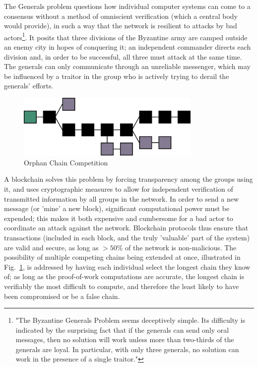 \documentclass[12pt,journal]{IEEEtran}
\begin{document}
The Generals problem questions how individual computer systems can come to a consensus without a method of omniscient verification (which a central body would provide), in such a way that the network is resilient to attacks by bad actors\footnote{"The Byzantine Generals Problem seems deceptively simple. Its difficulty is indicated by the surprising fact that if the generals can send only oral messages, then no solution will work unless more than two-thirds of the generals are loyal. In particular, with only three generals, no solution can work in the presence of a single traitor."\cite{lamport1982byzantine}}. It posits that three divisions of the Byzantine army are camped outside an enemy city in hopes of conquering it; an independent commander directs each division and, in order to be successful, all three must attack at the same time\cite{lamport1982byzantine}. The generals can only communicate through an unreliable messenger, which may be influenced by a traitor in the group who is actively trying to derail the generals' efforts.\par

\begin{figure}[!t]
\centering
\includegraphics[width=3.5in]{figures/raster/orphans.png}
\caption{Orphan Chain Competition}
\label{fig_orphans}
\end{figure}
A blockchain solves this problem by forcing transparency among the groups using it, and uses cryptographic measures to allow for independent verification of transmitted information by all groups in the network. In order to send a new message (or 'mine' a new block), significant computational power must be expended; this makes it both expensive and cumbersome for a bad actor to coordinate an attack against the network. Blockchain protocols thus ensure that transactions (included in each block, and the truly 'valuable' part of the system) are valid and secure, as long as $> 50\%$ of the network is non-malicious\cite{Kroll2013,Okupski2014,Fox2001}. The possibility of multiple competing chains being extended at once, illustrated in Fig.~\ref{fig_orphans}, is addressed by having each individual select the longest chain they know of; as long as the proof-of-work computations are accurate, the longest chain is verifiably the most difficult to compute, and therefore the least likely to have been compromised or be a false chain.
\end{document}
